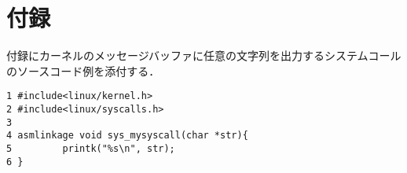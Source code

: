 \documentclass[12pt]{jsarticle}
\begin{document}
\section{付録}\label{sec:code}
付録にカーネルのメッセージバッファに任意の文字列を出力するシステムコールのソースコード例を添付する．
\begin{spacing}{0.7}
\begin{verbatim}
1 #include<linux/kernel.h>
2 #include<linux/syscalls.h>
3
4 asmlinkage void sys_mysyscall(char *str){
5         printk("%s\n", str);
6 }
\end{verbatim}
\end{spacing}
\end{document}
